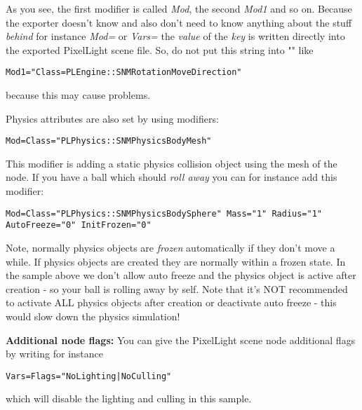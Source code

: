 As you see, the first modifier is called \emph{Mod}, the second \emph{Mod1} and so on. Because the exporter doesn't know and also don't need to know anything about the stuff \emph{behind} for instance \emph{Mod=} or \emph{Vars=} the \emph{value} of the \emph{key} is written directly into the exported PixelLight scene file. So, do not put this string into "" like

\begin{lstlisting}[caption=Invalid scene node modifier definition]
Mod1="Class=PLEngine::SNMRotationMoveDirection"
\end{lstlisting}

because this may cause problems.

Physics attributes are also set by using modifiers:

\begin{lstlisting}[caption=Physics mesh scene node modifier]
Mod=Class="PLPhysics::SNMPhysicsBodyMesh"
\end{lstlisting}

This modifier is adding a static physics collision object using the mesh of the node. If you have a ball which should \emph{roll away} you can for instance add this modifier:

\begin{lstlisting}[caption=Physics sphere scene node modifier]
Mod=Class="PLPhysics::SNMPhysicsBodySphere" Mass="1" Radius="1" AutoFreeze="0" InitFrozen="0"
\end{lstlisting}

Note, normally physics objects are \emph{frozen} automatically if they don't move a while. If physics objects are created they are normally within a frozen state. In the sample above we don't allow auto freeze and the physics object is active after creation - so your ball is rolling away by self. Note that it's NOT recommended to activate ALL physics objects after creation or deactivate auto freeze - this would slow down the physics simulation!


\textbf{Additional node flags:}
You can give the PixelLight scene node additional flags by writing for instance

\begin{lstlisting}[caption=Setting scene node flags]
Vars=Flags="NoLighting|NoCulling"
\end{lstlisting}

which will disable the lighting and culling in this sample.
